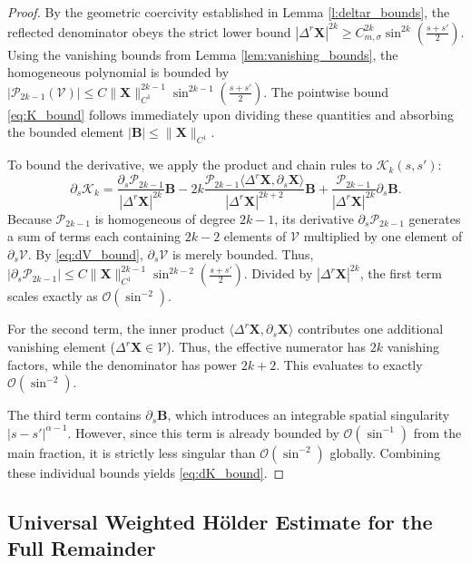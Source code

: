 \documentclass{amsart}
\begin{document}
\begin{proof}
By the geometric coercivity established in Lemma \ref{l:deltar_bounds}, the reflected denominator obeys the strict lower bound $|\Delta^r \mathbf{X}|^{2k} \ge C_{m,\sigma}^{2k} \sin^{2k}(\frac{s+s'}{2})$. Using the vanishing bounds from Lemma \ref{lem:vanishing_bounds}, the homogeneous polynomial is bounded by $|\mathcal{P}_{2k-1}(\mathcal{V})| \le C \|\mathbf{X}\|_{C^1}^{2k-1} \sin^{2k-1}(\frac{s+s'}{2})$. The pointwise bound \eqref{eq:K_bound} follows immediately upon dividing these quantities and absorbing the bounded element $|\mathbf{B}| \le \|\mathbf{X}\|_{C^1}$.

To bound the derivative, we apply the product and chain rules to $\mathcal{K}_k(s,s')$:
\begin{equation}
\partial_s \mathcal{K}_k = \frac{\partial_s \mathcal{P}_{2k-1}}{|\Delta^r \mathbf{X}|^{2k}} \mathbf{B} - 2k \frac{\mathcal{P}_{2k-1} \langle \Delta^r \mathbf{X}, \partial_s \mathbf{X} \rangle}{|\Delta^r \mathbf{X}|^{2k+2}} \mathbf{B} + \frac{\mathcal{P}_{2k-1}}{|\Delta^r \mathbf{X}|^{2k}} \partial_s \mathbf{B}.
\end{equation}
Because $\mathcal{P}_{2k-1}$ is homogeneous of degree $2k-1$, its derivative $\partial_s \mathcal{P}_{2k-1}$ generates a sum of terms each containing $2k-2$ elements of $\mathcal{V}$ multiplied by one element of $\partial_s \mathcal{V}$. By \eqref{eq:dV_bound}, $\partial_s \mathcal{V}$ is merely bounded. Thus, $|\partial_s \mathcal{P}_{2k-1}| \le C \|\mathbf{X}\|_{C^1}^{2k-1} \sin^{2k-2}(\frac{s+s'}{2})$. Divided by $|\Delta^r \mathbf{X}|^{2k}$, the first term scales exactly as $\mathcal{O}(\sin^{-2})$.

For the second term, the inner product $\langle \Delta^r \mathbf{X}, \partial_s \mathbf{X} \rangle$ contributes one additional vanishing element ($\Delta^r \mathbf{X} \in \mathcal{V}$). Thus, the effective numerator has $2k$ vanishing factors, while the denominator has power $2k+2$. This evaluates to exactly $\mathcal{O}(\sin^{-2})$. 

The third term contains $\partial_s \mathbf{B}$, which introduces an integrable spatial singularity $|s-s'|^{\alpha-1}$. However, since this term is already bounded by $\mathcal{O}(\sin^{-1})$ from the main fraction, it is strictly less singular than $\mathcal{O}(\sin^{-2})$ globally. Combining these individual bounds yields \eqref{eq:dK_bound}.
\end{proof}

\subsection{Universal Weighted Hölder Estimate for the Full Remainder}
\end{document}
